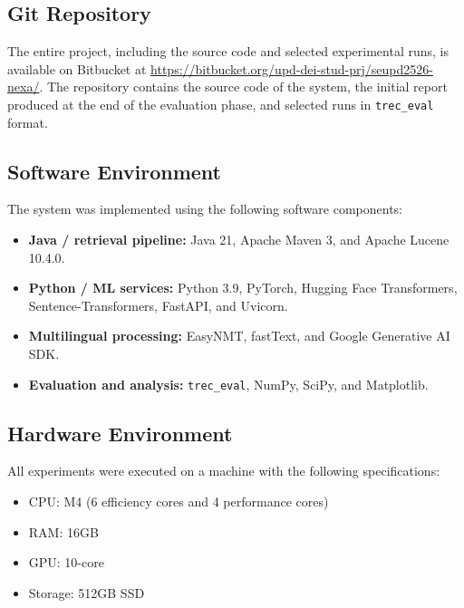 \subsection{Git Repository}
The entire project, including the source code and selected experimental runs, is available on Bitbucket at \url{https://bitbucket.org/upd-dei-stud-prj/seupd2526-nexa/}.
The repository contains the source code of the system, the initial report produced at the end of the evaluation phase, and selected runs in \texttt{trec\_eval} format.

\newpage
\subsection{Software Environment}
The system was implemented using the following software components:
\begin{itemize}
    \item \textbf{Java / retrieval pipeline:} Java 21, Apache Maven 3, and Apache Lucene 10.4.0.
    \item \textbf{Python / ML services:} Python 3.9, PyTorch, Hugging Face Transformers, Sentence-Transformers, FastAPI, and Uvicorn.
    \item \textbf{Multilingual processing:} EasyNMT, fastText, and Google Generative AI SDK.
    \item \textbf{Evaluation and analysis:} \texttt{trec\_eval}, NumPy, SciPy, and Matplotlib.
\end{itemize}

\subsection{Hardware Environment}
All experiments were executed on a machine with the following specifications:
\begin{itemize}
	\item CPU: M4 (6 efficiency cores and 4 performance cores)
	\item RAM: 16GB
	\item GPU: 10-core
	\item Storage: 512GB SSD
\end{itemize}


